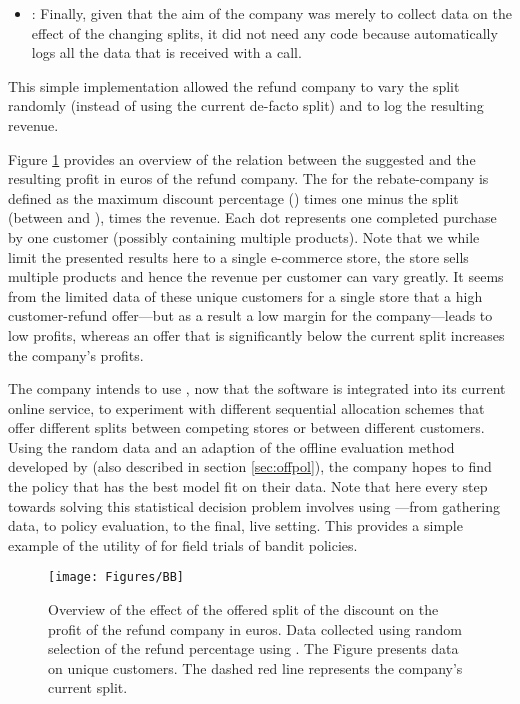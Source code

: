 \documentclass[nojss]{jss}
\begin{document}
\begin{itemize}
\item {}: Finally, given that the aim of the company was merely to collect data on the effect of the changing splits, it did not need any  code because  automatically logs all the data that is received with a  call.
\end{itemize}

This simple implementation allowed the refund company to vary the split randomly (instead of using the current de-facto  split) and to log the resulting revenue. 

Figure \ref{fig:BB} provides an overview of the relation between the suggested  and the resulting profit in euros of the refund company. The  for the rebate-company is defined as the maximum discount percentage () times one minus the split (between  and ), times the revenue. Each dot represents one completed purchase by one customer (possibly containing multiple products). Note that we while limit the presented results here to a single e-commerce store, the store sells multiple products and hence the revenue per customer can vary greatly. It seems from the limited data of these  unique customers for a single store that a high customer-refund offer---but as a result a low margin for the company---leads to low profits, whereas an offer that is significantly below the current  split increases the company's profits.

The company intends to use , now that the software is integrated into its current online service, to experiment with different sequential allocation schemes that offer different splits between competing stores or between different customers. Using the random data and an adaption of the offline evaluation method developed by \citep{Li2010a} (also described in section \ref{sec:offpol}), the company hopes to find the policy that has the best model fit on their data. Note that here every step towards solving this statistical decision problem involves using ---from gathering data, to policy evaluation, to the final, live setting. This provides a simple example of the utility of  for field trials of bandit policies.


\begin{figure}[h!]
  \centering
    \texttt{[image: Figures/BB]}
      \caption{Overview of the effect of the offered split of the discount on the profit of the refund company in euros. Data collected using random selection of the refund percentage using . The Figure presents data on  unique customers. The dashed red line represents the company's current  split.}
       \label{fig:BB}
\end{figure}
\end{document}
